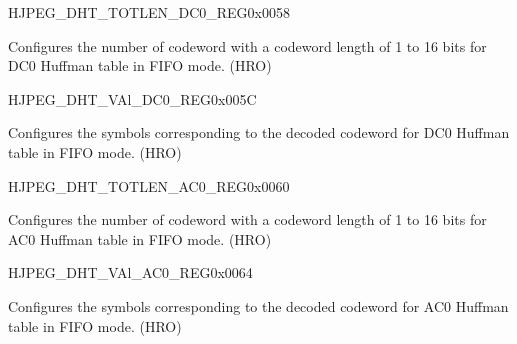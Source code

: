 \begin{register}{H}{JPEG\_DHT\_TOTLEN\_DC0\_REG}{0x0058}\label{regdesc:JPEGDHTTOTLENDC0REG}
%
\regnewline%
\begin{regdesc}\begin{reglist}
\label{fielddesc:JPEGDHTTOTLENDC0}\item [JPEG\_DHT\_TOTLEN\_DC0] Configures the number of codeword with a codeword length of 1 to 16 bits for DC0 Huffman table in FIFO mode. (HRO)
\end{reglist}\end{regdesc}
\end{register}


\begin{register}{H}{JPEG\_DHT\_VAl\_DC0\_REG}{0x005C}\label{regdesc:JPEGDHTVALDC0REG}
%
\regnewline%
\begin{regdesc}\begin{reglist}
\label{fielddesc:JPEGDHTVALDC0}\item [JPEG\_DHT\_VAL\_DC0] Configures the symbols corresponding to the decoded codeword for DC0 Huffman table in FIFO mode. (HRO)
\end{reglist}\end{regdesc}
\end{register}


\begin{register}{H}{JPEG\_DHT\_TOTLEN\_AC0\_REG}{0x0060}\label{regdesc:JPEGDHTTOTLENAC0REG}
%
\regnewline%
\begin{regdesc}\begin{reglist}
\label{fielddesc:JPEGDHTTOTLENAC0}\item [JPEG\_DHT\_TOTLEN\_AC0] Configures the number of codeword with a codeword length of 1 to 16 bits for AC0 Huffman table in FIFO mode. (HRO)
\end{reglist}\end{regdesc}
\end{register}


\begin{register}{H}{JPEG\_DHT\_VAl\_AC0\_REG}{0x0064}\label{regdesc:JPEGDHTVALAC0REG}
%
\regnewline%
\begin{regdesc}\begin{reglist}
\label{fielddesc:JPEGDHTVALAC0}\item [JPEG\_DHT\_VAL\_AC0] Configures the symbols corresponding to the decoded codeword for AC0 Huffman table in FIFO mode. (HRO)
\end{reglist}\end{regdesc}
\end{register}


